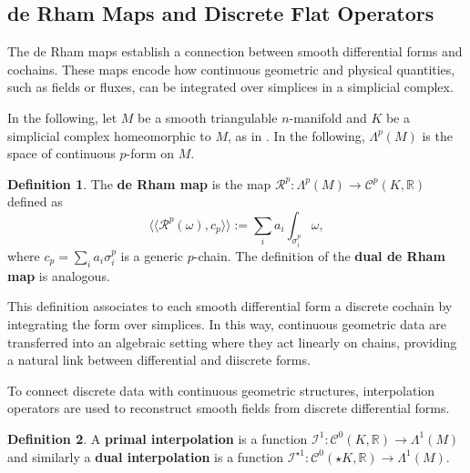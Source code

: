 \documentclass{article}
\theoremstyle{definition} %
\newtheorem{Def}{Definition}
\theoremstyle{plain} %
\theoremstyle{remark} %
\newcommand{\rr}{\mathbb{R}}
\newcommand{\llangle}{\langle \langle}
\newcommand{\rrangle}{\rangle \rangle}
\begin{document}
\subsection{de Rham Maps and Discrete Flat Operators}
The de Rham maps establish a connection between smooth differential forms and cochains. These maps encode how continuous geometric and physical quantities, such as fields or fluxes, can be integrated over simplices in a simplicial complex.

In the following, let $M$ be a smooth triangulable $n$-manifold and $K$ be a simplicial complex homeomorphic to $M$, as in \cite{hirani2003discrete}. In the following, $\Lambda^p(M)$ is the space of continuous $p$-form on $M$.

\begin{Def}
    The \textbf{de Rham map} is the map $\mathcal{R}^p: \Lambda^p(M) \rightarrow \mathcal{C}^p(K, \rr)$ defined as
     \begin{equation}
         \llangle \mathcal{R}^p(\omega), c_p \rrangle := \sum_i a_i \int_{\sigma^p_i} \omega,
     \end{equation}
     where $c_p = \sum_i a_i \sigma^p_i$ is a generic $p$-chain. The definition of the \textbf{dual de Rham map} is analogous.
\end{Def}


This definition associates to each smooth differential form a discrete cochain by integrating the form over simplices.  In this way, continuous geometric data are transferred into an algebraic setting where they act linearly on chains, providing a natural link between differential and diiscrete forms.


To connect discrete data with continuous geometric structures, interpolation operators are used to reconstruct smooth fields from discrete differential forms.


\begin{Def}
    A \textbf{primal interpolation} is a function $\mathcal{I}^1: \mathcal{C}^0(K, \rr) \rightarrow \Lambda^1(M)$ and similarly a \textbf{dual interpolation} is a function $\mathcal{I}^{\star 1}: \mathcal{C}^0(\star K, \rr) \rightarrow \Lambda^1(M)$.
\end{Def}
\end{document}
